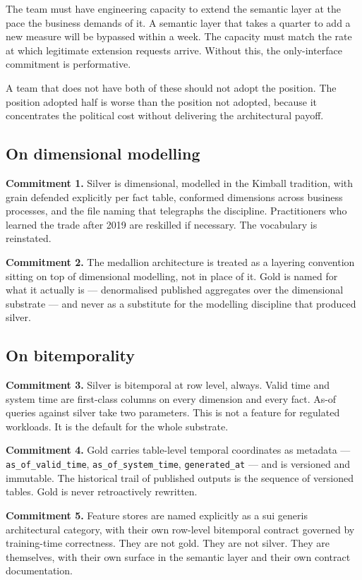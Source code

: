 \documentclass[11pt,a4paper]{article}
\begin{document}
The team must have engineering capacity to extend the semantic layer at the pace the business demands of it. A semantic layer that takes a quarter to add a new measure will be bypassed within a week. The capacity must match the rate at which legitimate extension requests arrive. Without this, the only-interface commitment is performative.

A team that does not have both of these should not adopt the position. The position adopted half is worse than the position not adopted, because it concentrates the political cost without delivering the architectural payoff.

\subsection{On dimensional modelling}

\textbf{Commitment 1.} Silver is dimensional, modelled in the Kimball tradition, with grain defended explicitly per fact table, conformed dimensions across business processes, and the file naming that telegraphs the discipline. Practitioners who learned the trade after 2019 are reskilled if necessary. The vocabulary is reinstated.

\textbf{Commitment 2.} The medallion architecture is treated as a layering convention sitting on top of dimensional modelling, not in place of it. Gold is named for what it actually is --- denormalised published aggregates over the dimensional substrate --- and never as a substitute for the modelling discipline that produced silver.

\subsection{On bitemporality}

\textbf{Commitment 3.} Silver is bitemporal at row level, always. Valid time and system time are first-class columns on every dimension and every fact. As-of queries against silver take two parameters. This is not a feature for regulated workloads. It is the default for the whole substrate.

\textbf{Commitment 4.} Gold carries table-level temporal coordinates as metadata --- \texttt{as\_of\_valid\_time}, \texttt{as\_of\_system\_time}, \texttt{generated\_at} --- and is versioned and immutable. The historical trail of published outputs is the sequence of versioned tables. Gold is never retroactively rewritten.

\textbf{Commitment 5.} Feature stores are named explicitly as a sui generis architectural category, with their own row-level bitemporal contract governed by training-time correctness. They are not gold. They are not silver. They are themselves, with their own surface in the semantic layer and their own contract documentation.
\end{document}

